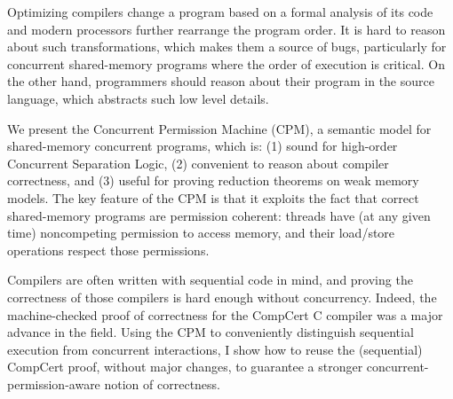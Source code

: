 Optimizing compilers change a program based on a formal analysis of its code and
modern processors further rearrange the program order. It is hard to reason about such 
transformations, which makes them a source of bugs, particularly for concurrent 
shared-memory programs where the order of execution is critical. On the other hand, 
programmers should reason about their program in the source language, which abstracts 
such low level details. 

We present the Concurrent Permission Machine (CPM), a semantic model for
shared-memory concurrent programs, which is: (1) sound for high-order Concurrent 
Separation Logic, (2) convenient to reason about compiler correctness, and (3) useful 
for proving reduction theorems on weak memory models. The key feature of the CPM
is that it exploits the fact that correct shared-memory programs are permission coherent: 
threads have (at any given time) noncompeting permission to access memory, and their
load/store operations respect those permissions.

Compilers are often written with sequential code in mind, and proving the correctness of
those compilers is hard enough without concurrency. Indeed, the machine-checked 
proof of correctness for the CompCert C compiler was a major advance in the field. 
Using the CPM to conveniently distinguish sequential execution from concurrent 
interactions, I show how to reuse the (sequential) CompCert proof, without major changes, 
to guarantee a stronger concurrent-permission-aware notion of correctness.